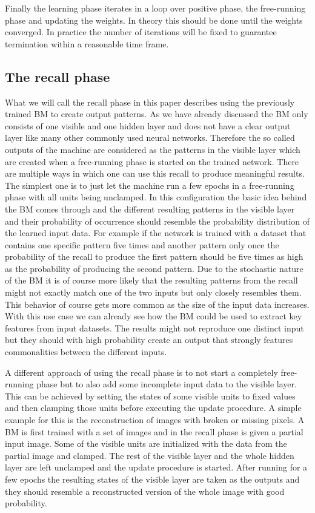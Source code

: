 \documentclass[12pt,twoside]{article}
\theoremstyle{plain}
\theoremstyle{definition}
\theoremstyle{remark}
\begin{document}
\noindent
Finally the learning phase iterates in a loop over positive phase, the free-running phase and updating the weights. In theory this should be done until the weights converged. In practice the number of iterations will be fixed to guarantee termination within a reasonable time frame.


\subsection{The recall phase}
\label{subsec:recall}

What we will call the recall phase in this paper describes using the previously trained BM to create output patterns.
As we have already discussed the BM only consists of one visible and one hidden layer and does not have a clear output
layer like many other commonly used neural networks. Therefore the so called outputs of the machine are considered as the patterns
in the visible layer which are created when a free-running phase is started on the trained network.
There are multiple ways in which one can use this recall to produce meaningful results. The simplest one is to just let the
machine run a few epochs in a free-running phase with all units being unclamped. In this configuration the basic idea behind the
BM comes through and the different resulting patterns in the visible layer and their probability of occurrence should
resemble the probability distribution of the learned input data. For example if the network is trained with a dataset
that contains one specific pattern five times and another pattern only once the probability of the recall to produce the first
pattern should be five times as high as the probability of producing the second pattern. Due to the stochastic nature of the BM
it is of course more likely that the resulting patterns from the recall might not exactly match one of the two inputs
but only closely resembles them. This behavior of course gets more common as the size of the input data increases.
With this use case we can already see how the BM could be used to extract key features from input datasets.
The results might not reproduce one distinct input but they should with high probability create an output that strongly
features commonalities between the different inputs.

A different approach of using the recall phase is to not start a completely free-running phase but to also add some incomplete
input data to the visible layer. This can be achieved by setting the states of some visible units to fixed values and then 
clamping those units before executing the update procedure. A simple example for this is the reconstruction of images
with broken or missing pixels. A BM is first trained with a set of images and in the recall phase
is given a partial input image. Some of the visible units are initialized with the data from the partial image and clamped.
The rest of the visible layer and the whole hidden layer are left unclamped and the update procedure is started.
After running for a few epochs the resulting states of the visible layer are taken as the outputs and they should
resemble a reconstructed version of the whole image with good probability.
\end{document}
